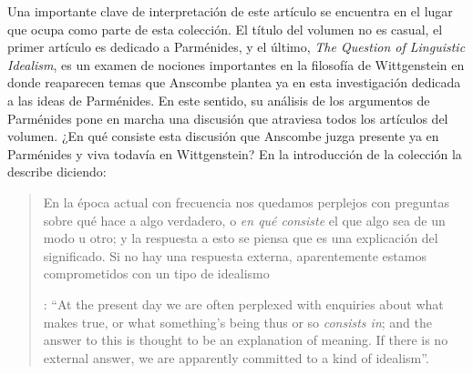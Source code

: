 Una importante clave de interpretación de este artículo se encuentra en el lugar que ocupa como parte de esta colección. El título del volumen no es casual, el primer artículo es dedicado a Parménides, y el último, \emph{The Question of Linguistic Idealism}, es un examen de nociones importantes en la filosofía de Wittgenstein en donde reaparecen temas que Anscombe plantea ya en esta investigación dedicada a las ideas de Parménides. En este sentido, su análisis de los argumentos de Parménides pone en marcha una discusión que atraviesa todos los artículos del volumen. ¿En qué consiste esta discusión que Anscombe juzga presente ya en Parménides y viva todavía en Wittgenstein? En la introducción de la colección la describe diciendo: \blockquote[{\Cite[xi]{anscombe1981parmenides}}: \enquote{At the present day we are often perplexed with enquiries about what makes true, or what something's being thus or so \emph{consists in}; and the answer to this is thought to be an explanation of meaning. If there is no external answer, we are apparently committed to a kind of idealism}.]{En la época actual con frecuencia nos quedamos perplejos con preguntas sobre qué hace a algo verdadero, o \emph{en qué consiste} el que algo sea de un modo u otro; y la respuesta a esto se piensa que es una explicación del significado. Si no hay una respuesta externa, aparentemente estamos comprometidos con un tipo de idealismo}.\label{subsec:intextq}

